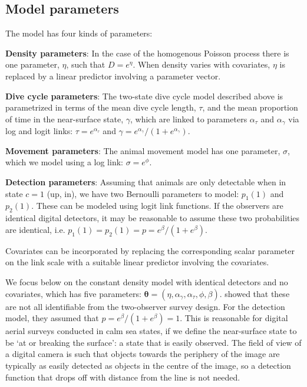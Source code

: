\documentclass[useAMS, usenatbib, referee]{biom}\usepackage[]{graphicx}\usepackage[]{color}
\begin{document}
\subsection{Model parameters}
\label{sec:model_parameters}

The model has four kinds of parameters:

\textbf{Density parameters}: In the case of the homogenous Poisson process there is one parameter, $\eta$, such that $D=e^{\eta}$. When density varies with covariates, $\eta$ is replaced by a linear predictor involving a parameter vector.

\textbf{Dive cycle parameters}: The two-state dive cycle model described above is parametrized in terms of the mean dive cycle length, $\tau$, and the mean proportion of time in the near-surface state, $\gamma$, which are linked to parameters $\alpha_\tau$ and $\alpha_\gamma$ via log and logit links: $\tau=e^{\alpha_\tau}$ and $\gamma=e^{\alpha_\gamma}/(1+e^{\alpha_\gamma})$.

\textbf{Movement parameters}: The animal movement model has one parameter, $\sigma$, which we model using a log link: $\sigma=e^\phi$.

\textbf{Detection parameters}: Assuming that animals are only detectable when in state $c=1$ (up, in), we have two Bernoulli parameters to model: $p_1(1)$ and  $p_2(1)$. These can be modeled using logit link functions. If the observers are identical digital detectors, it may be reasonable to assume these two probabilities are identical, i.e. $p_1(1)=p_2(1)=p=e^\beta/(1+e^\beta)$.

Covariates can be incorporated by replacing the corresponding scalar parameter on the link scale with a suitable linear predictor involving the covariates.


We focus below on the constant density model with identical detectors and no covariates, which has five parameters: $\bm{\theta}=(\eta,\alpha_\gamma,\alpha_\tau, \phi, \beta)$. \cite{Stevenson+al:19} showed that these are not all identifiable from the two-observer survey design. For the detection model, they assumed that $p=e^\beta/(1+e^\beta)=1$. This is reasonable for digital aerial surveys conducted in calm sea states, if we define the near-surface state to be `at or breaking the surface': a state that is easily observed. The field of view of a digital camera is such that objects towards the periphery of the image are typically as easily detected as objects in the centre of the image, so a detection function that drops off with distance from the line is not needed.
\end{document}
